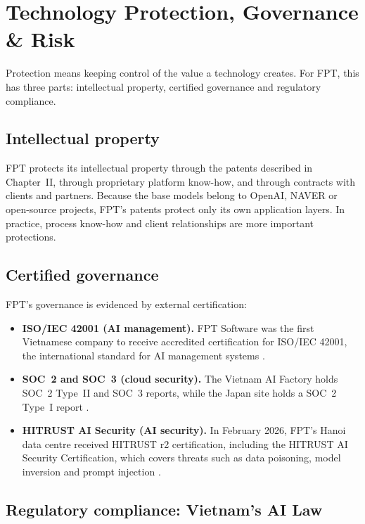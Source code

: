 \documentclass[a4paper,12pt]{report}
\begin{document}
\chapter{Technology Protection, Governance \& Risk}
Protection means keeping control of the value a technology creates. For FPT, this has three parts: intellectual property, certified governance and regulatory compliance.

\section{Intellectual property}

FPT protects its intellectual property through the patents described in Chapter~II, through proprietary platform know-how, and through contracts with clients and partners. Because the base models belong to OpenAI, NAVER or open-source projects, FPT's patents protect only its own application layers. In practice, process know-how and client relationships are more important protections.

\section{Certified governance}

FPT's governance is evidenced by external certification:

\begin{itemize}
  \item \textbf{ISO/IEC 42001 (AI management).} FPT Software was the first Vietnamese company to receive accredited certification for ISO/IEC 42001, the international standard for AI management systems \cite{S23,M11}.
  \item \textbf{SOC~2 and SOC~3 (cloud security).} The Vietnam AI Factory holds SOC~2 Type~II and SOC~3 reports, while the Japan site holds a SOC~2 Type~I report \cite{S28}.
  \item \textbf{HITRUST AI Security (AI security).} In February 2026, FPT's Hanoi data centre received HITRUST r2 certification, including the HITRUST AI Security Certification, which covers threats such as data poisoning, model inversion and prompt injection \cite{M18}.
\end{itemize}

\section{Regulatory compliance: Vietnam's AI Law}
\end{document}
